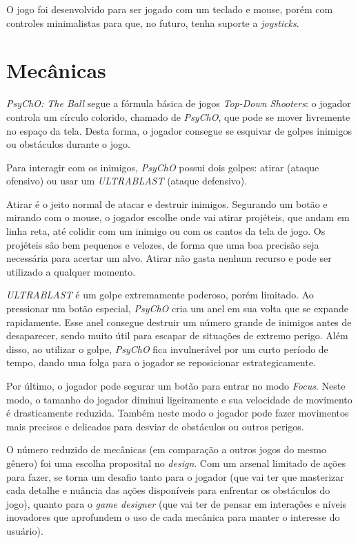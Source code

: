O jogo foi desenvolvido para ser jogado com um teclado e mouse, porém com controles minimalistas para que, no futuro, tenha suporte a \textit{joysticks}.

\section{Mecânicas}
\label{sec:mecanicas}

\textit{PsyChO: The Ball} segue a fórmula básica de jogos \textit{Top-Down Shooters}: o jogador controla um círculo colorido, chamado de \textit{PsyChO}, que pode se mover livremente no espaço da tela. Desta forma, o jogador consegue se esquivar de golpes inimigos ou obstáculos durante o jogo.

Para interagir com os inimigos, \textit{PsyChO} possui dois golpes: atirar (ataque ofensivo) ou usar um \textit{ULTRABLAST} (ataque defensivo).

Atirar é o jeito normal de atacar e destruir inimigos. Segurando um botão e mirando com o mouse, o jogador escolhe onde vai atirar projéteis, que andam em linha reta, até colidir com um inimigo ou com os cantos da tela de jogo. Os projéteis são bem pequenos e velozes, de forma que uma boa precisão seja necessária para acertar um alvo. Atirar não gasta nenhum recurso e pode ser utilizado a qualquer momento.

\textit{ULTRABLAST} é um golpe extremamente poderoso, porém limitado. Ao pressionar um botão especial, \textit{PsyChO} cria um anel em sua volta que se expande rapidamente. Esse anel consegue destruir um número grande de inimigos antes de desaparecer, sendo muito útil para escapar de situações de extremo perigo. Além disso, ao utilizar o golpe, \textit{PsyChO} fica invulnerável por um curto período de tempo, dando uma folga para o jogador se reposicionar estrategicamente.

Por último, o jogador pode segurar um botão para entrar no modo \textit{Focus}. Neste modo, o tamanho do jogador diminui ligeiramente e sua velocidade de movimento é drasticamente reduzida. Também neste modo o jogador pode fazer movimentos mais precisos e delicados para desviar de obstáculos ou outros perigos.

O número reduzido de mecânicas (em comparação a outros jogos do mesmo gênero) foi uma escolha proposital no \textit{design}. Com um arsenal limitado de ações para fazer, se torna um desafio tanto para o jogador (que vai ter que masterizar cada detalhe e nuância das ações disponíveis para enfrentar os obstáculos do jogo), quanto para o \textit{game designer} (que vai ter de pensar em interações e níveis inovadores que aprofundem o uso de cada mecânica para manter o interesse do usuário).

